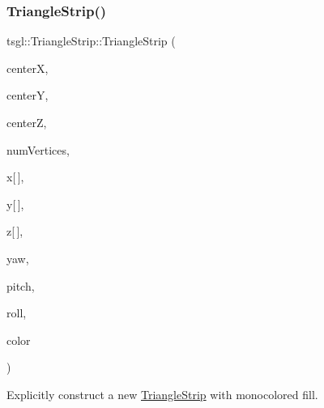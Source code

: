 \subsubsection{\texorpdfstring{Triangle\+Strip()}{TriangleStrip()}\hspace{0.1cm}{\footnotesize\ttfamily [1/2]}}
{\footnotesize\ttfamily tsgl\+::\+Triangle\+Strip\+::\+Triangle\+Strip (\begin{DoxyParamCaption}\item[{float}]{centerX,  }\item[{float}]{centerY,  }\item[{float}]{centerZ,  }\item[{int}]{num\+Vertices,  }\item[{float}]{x\mbox{[}$\,$\mbox{]},  }\item[{float}]{y\mbox{[}$\,$\mbox{]},  }\item[{float}]{z\mbox{[}$\,$\mbox{]},  }\item[{float}]{yaw,  }\item[{float}]{pitch,  }\item[{float}]{roll,  }\item[{\hyperlink{structtsgl_1_1_color_float}{Color\+Float}}]{color }\end{DoxyParamCaption})}



Explicitly construct a new \hyperlink{classtsgl_1_1_triangle_strip}{Triangle\+Strip} with monocolored fill. 

